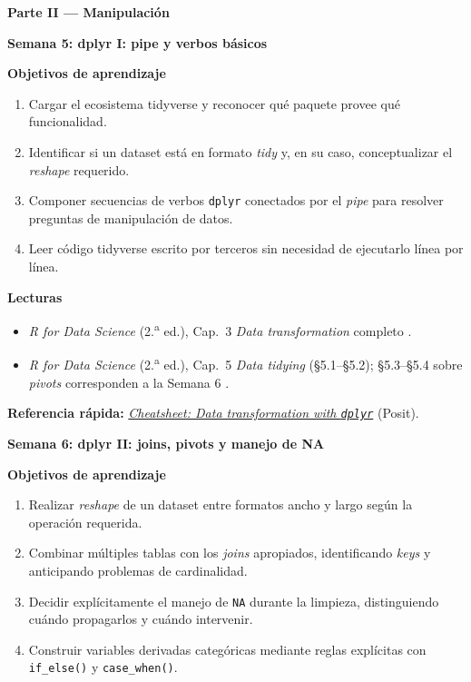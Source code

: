 \documentclass[11pt,letterpaper]{article}
\newcommand{\parteCurso}[1]{%
  \clearpage%
  \vspace*{0.5cm}%
  {\centering\color{main}\fontsize{26pt}{32pt}\selectfont\bfseries #1\par}%
  \vspace{0.8cm}%
}
\newcommand{\semana}[2]{%
  \bigskip%
  {\color{main}\Large\bfseries Semana #1: #2\par}%
  \smallskip%
}
\newcommand{\cheatsheet}[2]{%
  \href{https://rstudio.github.io/cheatsheets/#1.pdf}{\textit{Cheatsheet: #2}}%
}
\begin{document}
\parteCurso{Parte II --- Manipulación}

\semana{5}{dplyr I: pipe y verbos básicos}

\medskip
\noindent\textbf{Objetivos de aprendizaje}
\begin{enumerate}[leftmargin=*, itemsep=1pt]
    \item Cargar el ecosistema tidyverse y reconocer qué paquete provee qué funcionalidad.
    \item Identificar si un dataset está en formato \textit{tidy} y, en su caso, conceptualizar el \textit{reshape} requerido.
    \item Componer secuencias de verbos \texttt{dplyr} conectados por el \textit{pipe} para resolver preguntas de manipulación de datos.
    \item Leer código tidyverse escrito por terceros sin necesidad de ejecutarlo línea por línea.
\end{enumerate}

\medskip
\noindent\textbf{Lecturas}
\begin{itemize}[leftmargin=*, itemsep=1pt]
    \item \textit{R for Data Science} (2.\textsuperscript{a} ed.), Cap.\ 3 \textit{Data transformation} completo \cite{wickham2023r4ds}.
    \item \textit{R for Data Science} (2.\textsuperscript{a} ed.), Cap.\ 5 \textit{Data tidying} (§5.1--§5.2); §5.3--§5.4 sobre \textit{pivots} corresponden a la Semana 6 \cite{wickham2023r4ds}.
\end{itemize}

\medskip
\noindent\textbf{Referencia rápida:} \cheatsheet{data-transformation}{Data transformation with \texttt{dplyr}} (Posit).

\semana{6}{dplyr II: joins, pivots y manejo de NA}

\medskip
\noindent\textbf{Objetivos de aprendizaje}
\begin{enumerate}[leftmargin=*, itemsep=1pt]
    \item Realizar \textit{reshape} de un dataset entre formatos ancho y largo según la operación requerida.
    \item Combinar múltiples tablas con los \textit{joins} apropiados, identificando \textit{keys} y anticipando problemas de cardinalidad.
    \item Decidir explícitamente el manejo de \texttt{NA} durante la limpieza, distinguiendo cuándo propagarlos y cuándo intervenir.
    \item Construir variables derivadas categóricas mediante reglas explícitas con \texttt{if\_else()} y \texttt{case\_when()}.
\end{enumerate}
\end{document}
